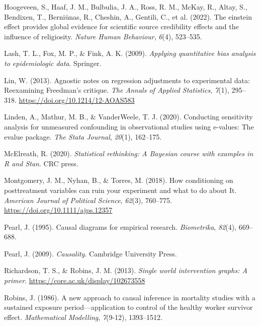 \documentclass[
  single column]{article}
\newlength{\cslhangindent}
\newenvironment{CSLReferences}[2] %
 {\begin{list}{}{%
  \setlength{\itemindent}{0pt}
  \setlength{\leftmargin}{0pt}
  \setlength{\parsep}{0pt}
  \ifodd #1
   \setlength{\leftmargin}{\cslhangindent}
   \setlength{\itemindent}{-1\cslhangindent}
  \fi
  \setlength{\itemsep}{#2\baselineskip}}}
 {\end{list}}
\begin{document}
\begin{CSLReferences}{1}{0}
Hoogeveen, S., Haaf, J. M., Bulbulia, J. A., Ross, R. M., McKay, R.,
Altay, S., Bendixen, T., Berniūnas, R., Cheshin, A., Gentili, C., et al.
(2022). The einstein effect provides global evidence for scientific
source credibility effects and the influence of religiosity.
\emph{Nature Human Behaviour}, \emph{6}(4), 523--535.

Lash, T. L., Fox, M. P., \& Fink, A. K. (2009). \emph{Applying
quantitative bias analysis to epidemiologic data}. Springer.

Lin, W. (2013). {Agnostic notes on regression adjustments to
experimental data: Reexamining Freedman's critique}. \emph{The Annals of
Applied Statistics}, \emph{7}(1), 295--318.
\url{https://doi.org/10.1214/12-AOAS583}

Linden, A., Mathur, M. B., \& VanderWeele, T. J. (2020). Conducting
sensitivity analysis for unmeasured confounding in observational studies
using e-values: The evalue package. \emph{The Stata Journal},
\emph{20}(1), 162--175.

McElreath, R. (2020). \emph{Statistical rethinking: A {B}ayesian course
with examples in {R} and {S}tan}. CRC press.

Montgomery, J. M., Nyhan, B., \& Torres, M. (2018). How conditioning on
posttreatment variables can ruin your experiment and what to do about
It. \emph{American Journal of Political Science}, \emph{62}(3),
760--775. \url{https://doi.org/10.1111/ajps.12357}

Pearl, J. (1995). Causal diagrams for empirical research.
\emph{Biometrika}, \emph{82}(4), 669--688.

Pearl, J. (2009). \emph{Causality}. Cambridge University Press.

Richardson, T. S., \& Robins, J. M. (2013). \emph{Single world
intervention graphs: A primer}.
\url{https://core.ac.uk/display/102673558}

Robins, J. (1986). A new approach to causal inference in mortality
studies with a sustained exposure period---application to control of the
healthy worker survivor effect. \emph{Mathematical Modelling},
\emph{7}(9-12), 1393--1512.


\end{CSLReferences}
\end{document}
